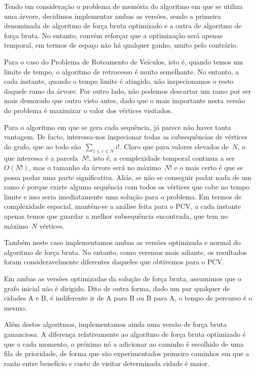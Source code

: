 \documentclass[12pt,a4paper,reqno]{report}
\numberwithin{equation}{section}
\begin{document}
Tendo em consideração o problema de memória do algoritmo em que se utiliza uma árvore, decidimos implementar ambas as versões, sendo a primeira denominada de algoritmo de força bruta optimizado e a outra de algoritmo de força bruta. No entanto, convém reforçar que a optimização será apenas temporal, em termos de espaço não há qualquer ganho, muito pelo contrário.

Para o caso do Problema de Roteamento de Veículos, isto é, quando temos um limite de tempo, o algoritmo de retrocesso é muito semelhante. No entanto, a cada instante, quando o tempo limite é atingido, não inspecionamos o resto daquele ramo da árvore. Por outro lado, não podemos descartar um ramo por ser mais demorado que outro visto antes, dado que o mais importante nesta versão do problema é maximizar o valor dos vértices visitados.

Para o algoritmo em que se gera cada sequência, já parece não haver tanta vantagem. De facto, interessa-nos inspecionar todas as subsequências de vértices do grafo, que ao todo são~$\sum_{1 \leq i \leq N} i!$. Claro que para valores elevados de~$N$, o que interessa é a parcela~$N!$, isto é, a complexidade temporal continua a ser~$O(N!)$, mas o tamanho da árvore será no máximo~$N!$ e o mais certo é que se possa podar uma parte significativa. Aliás, se não se conseguir podar nada de um ramo é porque existe alguma sequência com todos os vértices que cabe no tempo limite e isso seria imediatamente uma solução para o problema. Em termos de complexidade espacial, mantém-se a análise feita para o PCV, a cada instante apenas temos que guardar a melhor subsequência encontrada, que tem no máximo~$N$ vértices.

Também neste caso implementamos ambas as versões optimizada e normal do algoritmo de força bruta. No entanto, como veremos mais adiante, os resultados foram consideravelmente diferentes daqueles que obtivemos para o PCV.

Em ambas as versões optimizadas da solução de força bruta, assumimos que o grafo inicial não é dirigido. Dito de outra forma, dado um par qualquer de cidades A e B, é indiferente ir de A para B ou B para A, o tempo de percurso é o mesmo.

Além destes algoritmos, implementamos ainda uma versão de força bruta gananciosa. A diferença relativamente ao algoritmo de força bruta optimizado é que a cada momento, o próximo nó a adicionar ao caminho é escolhido de uma fila de prioridade, de forma que são experimentados primeiro caminhos em que a razão entre benefício e custo de visitar determinada cidade é maior.
\end{document}
